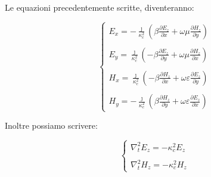 Le equazioni precedentemente scritte, diventeranno: 

{
    \Large 
    \begin{equation}
        \begin{cases}
            E_x = - \frac{\jmath}{\kappa_c ^{2}} (\beta \frac{\partial E_z}{\partial x} + \omega \mu \frac{\partial H_z}{\partial y}) \\ \\ 
            E_y =  \frac{\jmath}{\kappa_c ^{2}} (- \beta \frac{\partial E_z}{\partial y} + \omega \mu \frac{\partial H_z}{\partial x}) \\ \\ 
            H_x =  \frac{\jmath}{\kappa_c ^{2}} (- \beta \frac{\partial H_z}{\partial x} + \omega \varepsilon \frac{\partial E_z}{\partial y}) \\ \\ 
            H_y =  -\frac{\jmath}{\kappa_c ^{2}} ( \beta \frac{\partial H_z}{\partial y} + \omega \varepsilon \frac{\partial E_z}{\partial x}) 
        \end{cases}
    \end{equation}
}

Inoltre possiamo scrivere: 

{
    \Large 
    \begin{equation}
        \begin{cases}
            \nabla_t ^{2} E_z = - \kappa_c ^{2} E_z \\ \\
            \nabla_t ^{2} H_z = - \kappa_c ^{2} H_z     
        \end{cases}
    \end{equation} 
}

\newpage